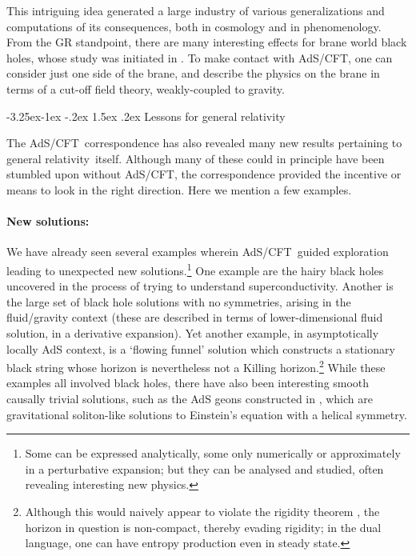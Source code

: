 \documentclass[12pt,a4paper]{article}
\makeatletter
\renewcommand\subsection{\@startsection{subsection}{2}{\z@}%
                                     {-3.25ex\@plus -1ex \@minus -.2ex}%
                                     {1.5ex \@plus .2ex}%
                                     {\normalfont\bfseries}}
\def\AC{AdS/CFT}
\def\GR{general relativity}
\makeatother
\begin{document}
This intriguing idea generated a large industry of various generalizations  and computations of its consequences, both in cosmology and in phenomenology.  
From the GR standpoint, there are many interesting effects for brane world black holes, whose study was initiated in \cite{Emparan:1999wa}.  To make contact with \AC, one can consider just one side of the brane, and describe the physics on the brane in terms of a cut-off field theory,  weakly-coupled to gravity.

\subsection{Lessons for \GR}
\label{s:lessonsGR}

The \AC\ correspondence has also revealed many new results pertaining to \GR\ itself.  
Although many of these could in principle have been stumbled upon without \AC, the correspondence provided the incentive or means to look in the right direction.  Here we mention a few examples.

\paragraph{New solutions:}  %
We have already seen several examples wherein \AC\ guided exploration 
 leading to unexpected new solutions.\footnote{
Some can be expressed analytically, some only numerically or approximately in a perturbative expansion; but they can be analysed and studied, often revealing interesting new physics.
}    One example are the hairy black holes uncovered in the process of trying to understand superconductivity.  
Another is the large set of black hole solutions with no symmetries, arising in the fluid/gravity context (these are described in terms of lower-dimensional fluid solution, in a derivative expansion).  
Yet another example, in asymptotically locally AdS context,
  is a `flowing funnel' solution \cite{Fischetti:2012vt,Figueras:2012rb} which constructs a stationary black string whose horizon is nevertheless not a Killing horizon.\footnote{
  Although this would naively appear to violate the rigidity theorem \cite{Hollands:2006rj}, the horizon in question is non-compact, thereby evading rigidity; in the dual language, one can have entropy production even in steady state.}
While these examples all involved black holes, there have also been interesting smooth causally trivial solutions, such as the AdS  geons constructed in \cite{Dias:2011at}, which are gravitational soliton-like solutions to Einstein's equation with a helical symmetry. 
\end{document}
